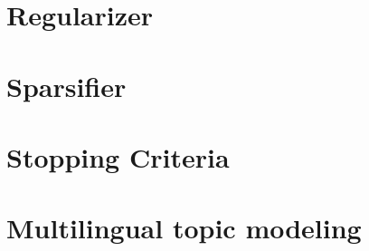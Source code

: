 \documentclass{article}
\begin{document}
\clearpage	\section{Regularizer} \label{regularizer} 

\clearpage	\section{Sparsifier} \label{sparsifier} 

\clearpage	\section{Stopping Criteria} \label{stoppingCriteria} 

\clearpage	\section{Multilingual topic modeling} \label{multilingual}


 
\end{document}
